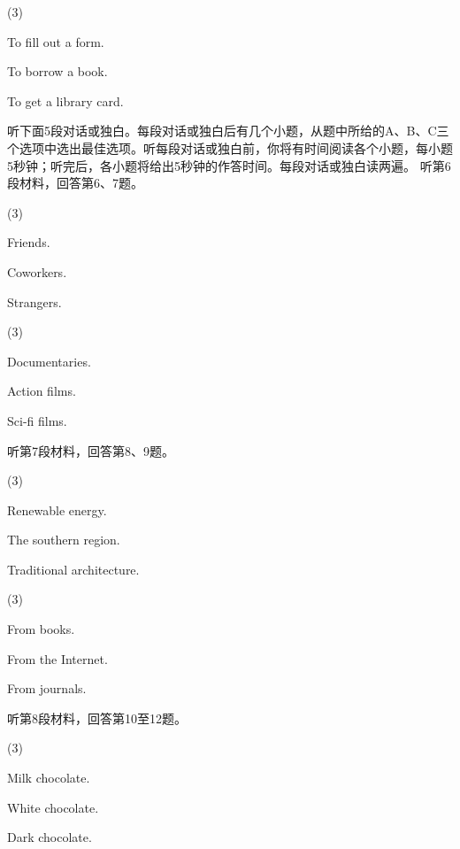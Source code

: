 \documentclass{英语试卷}
\begin{document}
\begin{choices}(3)
  \item To fill out a form.
  \item To borrow a book.
  \item To get a library card.
\end{choices}
\par 听下面5段对话或独白。每段对话或独白后有几个小题，从题中所给的A、B、C三个选项中选出最佳选项。听每段对话或独白前，你将有时间阅读各个小题，每小题5秒钟；听完后，各小题将给出5秒钟的作答时间。每段对话或独白读两遍。 听第6段材料，回答第6、7题。\par
{}
\begin{choices}(3)
  \item Friends.
  \item Coworkers.
  \item Strangers.
\end{choices}
\begin{choices}(3)
  \item Documentaries.
  \item Action films.
  \item Sci-fi films.
\end{choices}
\par 听第7段材料，回答第8、9题。\par
{}
\begin{choices}(3)
  \item Renewable energy.
  \item The southern region.
  \item Traditional architecture.
\end{choices}
\begin{choices}(3)
  \item From books.
  \item From the Internet.
  \item From journals.
\end{choices}
\par 听第8段材料，回答第10至12题。\par
{}
\begin{choices}(3)
  \item Milk chocolate.
  \item White chocolate.
  \item Dark chocolate.
\end{choices}
\end{document}
